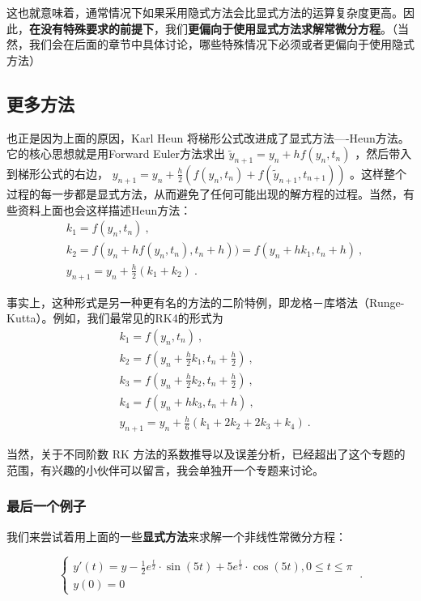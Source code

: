 这也就意味着，通常情况下如果采用隐式方法会比显式方法的运算复杂度更高。因此，\textbf{在没有特殊要求的前提下}，我们\textbf{更偏向于使用显式方法求解常微分方程}。（当然，我们会在后面的章节中具体讨论，哪些特殊情况下必须或者更偏向于使用隐式方法）

\subsection{更多方法}

也正是因为上面的原因，Karl Heun 将梯形公式改进成了显式方法----Heun方法。它的核心思想就是用Forward Euler方法求出 $\tilde{y}_{n+1}=y_n+hf(y_n,t_n)$ ，然后带入到梯形公式的右边， $y_{n+1}=y_n+\frac{h}{2}\left(f(y_n,t_n)+f(\tilde{y}_{n+1},t_{n+1}) \right)$ 。这样整个过程的每一步都是显式方法，从而避免了任何可能出现的解方程的过程。当然，有些资料上面也会这样描述Heun方法：
\begin{equation}
\begin{aligned}
&k_1=f(y_n,t_n)~,\\
&k_2=f(y_n+hf(y_n,t_n),t_n+h))=f(y_n+hk_1,t_n+h)~,\\
&y_{n+1}=y_n+\frac{h}{2}(k_1+k_2)~.
\end{aligned}
\end{equation}

事实上，这种形式是另一种更有名的方法的二阶特例，即龙格－库塔法（Runge-Kutta）。例如，我们最常见的RK4的形式为
\begin{equation}
\begin{aligned}
&k_1=f(y_n,t_n)~,\\
&k_2=f\left(y_n+\frac{h}{2}k_1, t_n+\frac{h}{2}\right)~,\\
&k_3=f\left(y_n+\frac{h}{2}k_2, t_n+\frac{h}{2}\right)~,\\
&k_4=f\left(y_n+hk_3, t_n+h\right)~,\\
&y_{n+1}=y_{n}+\frac{h}{6}(k_1+2k_2+2k_3+k_4)~.
\end{aligned}
\end{equation}

当然，关于不同阶数 RK 方法的系数推导以及误差分析，已经超出了这个专题的范围，有兴趣的小伙伴可以留言，我会单独开一个专题来讨论。

\subsubsection{最后一个例子}

我们来尝试着用上面的一些\textbf{显式方法}来求解一个非线性常微分方程：

\begin{equation}
\begin{cases}
 y'(t) = y-\frac{1}{2}e^{\frac{t}{2}}\cdot\sin(5t)+5e^{\frac{t}{2}}\cdot\cos(5t), 0\le t\le \pi\\ y(0)=0
\end{cases}~.
\end{equation}

